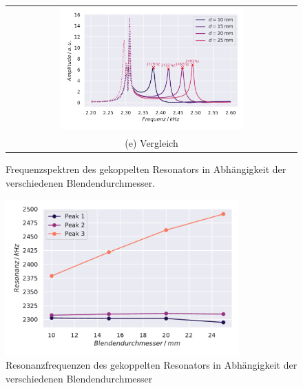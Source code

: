 \begin{figure}[H]
\begin{tabular}{cc}
  \multicolumn{2}{c}{\includegraphics[width=0.65\textwidth]{Daten/Wasserstoffmolekuelion/neu/blendAbhaeng.pdf}}\\[6pt]
  \multicolumn{2}{c}{(e) Vergleich}
  \end{tabular}
  \caption{Frequenzspektren des gekoppelten Resonators in Abhängigkeit der verschiedenen Blendendurchmesser.} 
  \label{fig:h2}
\end{figure}
\begin{figure}[H]
  \centering
  \includegraphics[width=0.8\textwidth]{Daten/Wasserstoffmolekuelion/neu/resonanzBlend.pdf}
  \caption{Resonanzfrequenzen des gekoppelten Resonators in Abhängigkeit der verschiedenen Blendendurchmesser}
  \label{fig:h2Res}
\end{figure}
